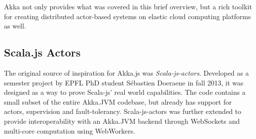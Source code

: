 \documentclass{sig-alternate}
\begin{document}
Akka not only provides what was covered in this brief overview, but a rich toolkit for creating distributed actor-based systems on elastic cloud computing platforms as well.


\subsection{Scala.js Actors}

The original source of inspiration for Akka.js was \textit{Scala-js-actors}.
Developed as a semester project by EPFL PhD student Sébastien Doeraene in fall 2013, it was designed as a way to prove Scala-js' real world capabilities.
The code contains a small subset of the entire Akka.JVM codebase, but already has support for actors, supervision and fault-tolerancy.
Scala-js-actors was further extended to provide interoperability with an Akka.JVM backend through WebSockets and multi-core computation using WebWorkers.
\end{document}
